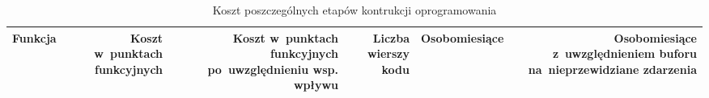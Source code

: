 \documentclass{mwrep}
\begin{document}
\begin{table}
    \caption{Koszt poszczególnych etapów kontrukcji oprogramowania}
    \begin{center}
        \begin{tabular}{|p{7cm}|r|r|r|r|r|} \hline
            \multicolumn{1}{|m{7cm}|}{\centering Funkcja}                                                                        &
            \multicolumn{1}{m{2,5cm}|}{\centering Koszt w~punktach funkcyjnych}                                                  &
            \multicolumn{1}{m{4cm}|}{\centering Koszt w~punktach funkcyjnych po~uwzględnieniu wsp. wpływu}                       &
            \multicolumn{1}{m{2,5cm}|}{\centering Liczba wierszy kodu}                                                           &
            \multicolumn{1}{m{2,5cm}|}{\centering Osobomiesiące}                                                                 &
            \multicolumn{1}{m{4cm}|}{\centering Osobomiesiące z~uwzględnieniem buforu na~nieprzewidziane zdarzenia}              \\ \hline


\end{tabular}
\end{center}
\end{table}
\end{document}
